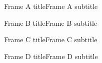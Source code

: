 





\begin{frame}[plain]
	\titlepage{}
\end{frame}

\begin{frameA}{Frame A title}{Frame A subtitle}
\end{frameA}

\begin{frameB}{Frame B title}{Frame B subtitle}
\end{frameB}

\begin{frameC}{Frame C title}{Frame C subtitle}
\end{frameC}

\begin{frameD}{Frame D title}{Frame D subtitle}
\end{frameD}



